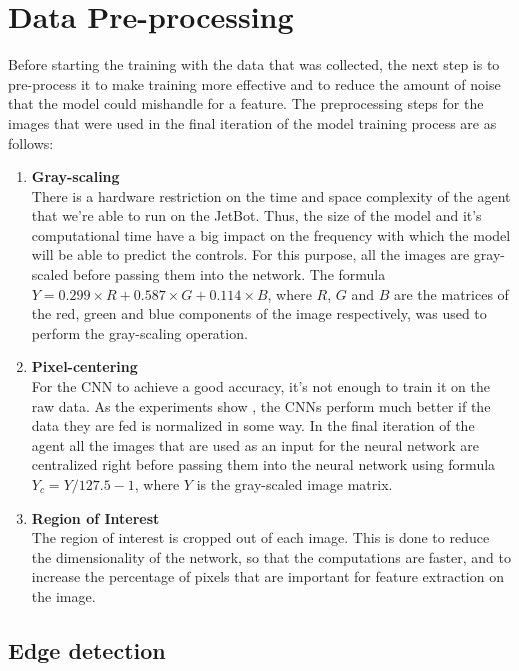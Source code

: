 \section{Data Pre-processing}

Before starting the training with the data that was collected, the next step is to pre-process it to make training more effective and to reduce the amount of noise that the model could mishandle for a feature. The preprocessing steps for the images that were used in the final iteration of the model training process are as follows:

\begin{enumerate}
  \item \textbf{Gray-scaling} \\
    There is a hardware restriction on the time and space complexity of the agent that we're able to run on the JetBot. Thus, the size of the model and it's computational time have a big impact on the frequency with which the model will be able to predict the controls. For this purpose, all the images are gray-scaled before passing them into the network. The formula $Y = 0.299 \times R + 0.587 \times G + 0.114 \times B$, where $R$, $G$ and $B$ are the matrices of the red, green and blue components of the image respectively, was used to perform the gray-scaling operation.
  \item \textbf{Pixel-centering} \\
    For the CNN to achieve a good accuracy, it's not enough to train it on the raw data. As the experiments show \autocite{pal2016preprocessing}, the CNNs perform much better if the data they are fed is normalized in some way. In the final iteration of the agent all the images that are used as an input for the neural network are centralized right before passing them into the neural network using formula $Y_c = Y / 127.5 - 1$, where $Y$ is the gray-scaled image matrix.
  \item \textbf{Region of Interest} \\
    The region of interest  is cropped out of each image. This is done to reduce the dimensionality of the network, so that the computations are faster, and to increase the percentage of pixels that are important for feature extraction on the image.
\end{enumerate}

\subsection{Edge detection}
\label{sec:edge-detection}

